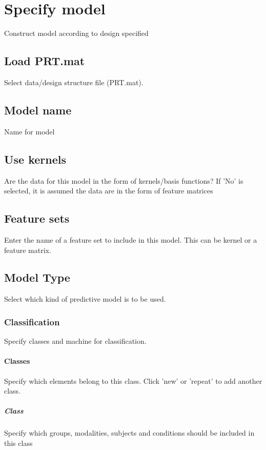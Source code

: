 
\chapter{Specify model  \label{Chap:model}}

\vskip 1.5cm

Construct model according to design specified


\section{Load PRT.mat}
Select data/design structure file (PRT.mat).


\section{Model name}
Name for model


\section{Use kernels}
Are the data for this model in the form of kernels/basis functions? If 'No' is selected, it is assumed the data are in the form of feature matrices


\section{Feature sets}
Enter the name of a feature set to include in this model. This can be kernel or a feature matrix. 


\section{Model Type }
Select which kind of predictive model is to be used.


\subsection{Classification}
Specify classes and machine for classification.


\subsubsection{Classes}
Specify which elements belong to this class. Click 'new' or 'repeat' to add another class.


\paragraph{Class}
Specify which groups, modalities, subjects and conditions should be included in this class


